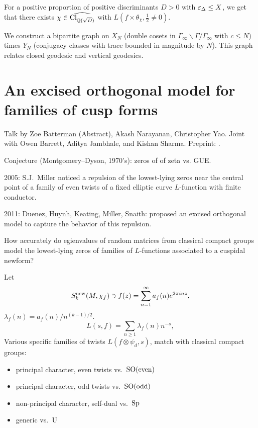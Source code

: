 \documentclass[reqno]{amsart} 
\begin{document}
\begin{theorem}[C--Nordentoft 2024]
  For a positive proportion of positive discriminants $D > 0$ with $\varepsilon_\Delta \leq X$, we get that there exists $\chi \in \widehat{\operatorname{Cl}_{\mathbb{Q}(\sqrt{D})}}$
  with $L(f \times \theta_\chi, \tfrac{1}{2} \neq 0)$.
\end{theorem}

We construct a bipartite graph on $X_N$ (double cosets in $\Gamma_\infty \backslash \Gamma / \Gamma_\infty$ with $c \leq N$) times $Y_N$ (conjugacy classes with trace bounded in magnitude by $N$).  This graph relates closed geodesic and vertical geodesics.


\section{An excised orthogonal model for families of cusp forms}
Talk by Zoe Batterman (Abstract), Akash Narayanan, Christopher Yao.  Joint with Owen Barrett, Aditya Jambhale, and Kishan Sharma.  Preprint: \cite{2024arXiv2407.14526}.

Conjecture (Montgomery--Dyson, 1970's): zeros of of zeta vs. GUE.

2005: S.J.\ Miller noticed a repulsion of the lowest-lying zeros near the central point of a family of even twists of a fixed elliptic curve $L$-function with finite conductor.

2011: Duenez, Huynh, Keating, Miller, Snaith: proposed an excised orthogonal model to capture the behavior of this repulsion.

\begin{question}
  How accurately do egienvalues of random matrices from classical compact groups model the lowest-lying zeros of families of $L$-functions associated to a cuspidal newform?
\end{question}

Let
\begin{equation*}
  S_k^{\operatorname{new}}(M, \chi_f) \ni f(z) = \sum_{n = 1}^\infty a_f(n) e^{2 \pi i n z},
\end{equation*}
$\lambda_f(n) = a_f(n) / n^{(k - 1)/2}$.
\begin{equation*}
  L(s, f) = \sum_{n \geq 1} \lambda_f(n) n^{- s},
\end{equation*}
Various specific families of twists $L(f \otimes \psi_d, s)$, match with classical compact groups:
\begin{itemize}
\item principal character, even twists vs.\ $\operatorname{SO}(\mathrm{even})$
\item principal character, odd twists vs.\ $\operatorname{SO}(\mathrm{odd})$
\item non-principal character, self-dual vs.\ $\operatorname{Sp}$
\item generic vs.\ $\operatorname{U}$
\end{itemize}
\end{document}
